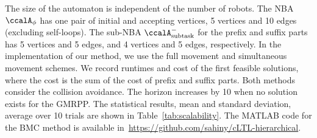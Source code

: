 \documentclass[Afour,sageh,times]{sagej}
\newcommand{\auto}[1]{\ccalA_{\textup{#1}}}
\newcommand{\autop}{\ccalA_{\phi}}
\begin{document}
{The size of the automaton is independent of the number of robots. The NBA $\autop$ has one pair of initial and accepting vertices, 5 vertices and 10 edges (excluding self-loops). The sub-NBA $\auto{subtask}^-$ for the prefix and suffix  parts has 5 vertices and 5 edges, and 4 vertices and 5 edges, respectively. In the implementation of our method, we use the full movement and simultaneous movement schemes. We record runtimes  and cost of the first feasible solutions, where the cost is the sum of the cost of prefix and suffix parts. %
Both methods consider the collision avoidance. The horizon increases by 10 when no solution exists for the GMRPP.
The statistical results, mean and standard deviation, average over 10 trials are shown in Table~\ref{tab:scalability}. The MATLAB code for the BMC method is available in~\url{https://github.com/sahiny/cLTL-hierarchical}.
\begin{table}[!t]
  \caption{Results with respect to the number of robots}\label{tab:scalability}
  \centering
\end{table}

}
\end{document}
